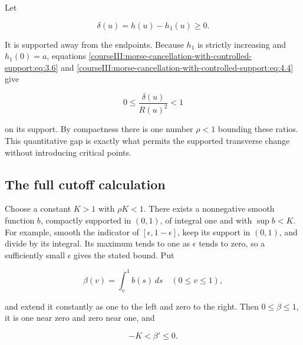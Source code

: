 Let

\begin{equation}
\delta(u)=h(u)-h_1(u)\geq0.
\label{courseIII:morse-cancellation-with-controlled-support:eq:4.4}
\end{equation}

It is supported away from the endpoints. Because \(h_1\) is strictly increasing and \(h_1(0)=a\), equations \eqref{courseIII:morse-cancellation-with-controlled-support:eq:3.6} and \eqref{courseIII:morse-cancellation-with-controlled-support:eq:4.4} give

\begin{equation}
0\leq\frac{\delta(u)}{R(u)^2}<1
\label{courseIII:morse-cancellation-with-controlled-support:eq:4.5}
\end{equation}

on its support. By compactness there is one number \(\rho<1\) bounding these ratios. This quantitative gap is exactly what permits the supported transverse change without introducing critical points.

\subsection{The full cutoff calculation}
\label{courseIII:morse-cancellation-with-controlled-support:morse-supported-cutoff}

\label{courseIII:morse-cancellation-with-controlled-support:section-5}

Choose a constant \(K>1\) with \(\rho K<1\). There exists a nonnegative smooth function \(b\), compactly supported in \((0,1)\), of integral one and with \(\sup b<K\). For example, smooth the indicator of \([\epsilon,1-\epsilon]\), keep its support in \((0,1)\), and divide by its integral. Its maximum tends to one as \(\epsilon\) tends to zero, so a sufficiently small \(\epsilon\) gives the stated bound. Put

\begin{equation}
\beta(v)=\int_v^1b(s)\,ds\quad(0\leq v\leq1),
\label{courseIII:morse-cancellation-with-controlled-support:eq:5.1}
\end{equation}

and extend it constantly as one to the left and zero to the right. Then \(0\leq\beta\leq1\), it is one near zero and zero near one, and

\begin{equation}
-K<\beta'\leq0.
\label{courseIII:morse-cancellation-with-controlled-support:eq:5.2}
\end{equation}


